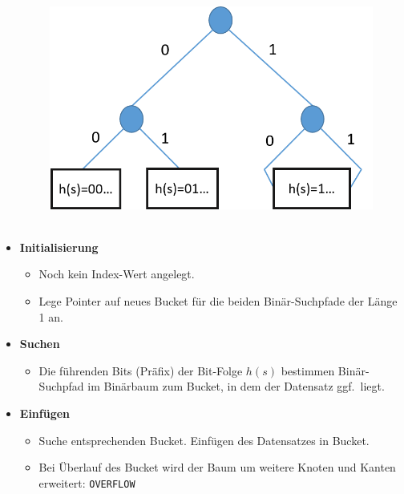 \begin{frame}{\insertsection}
\begin{columns}[T]
\begin{column}{.72\textwidth}
	\end{column}
	\onslide
	\begin{column}{.27\textwidth}
		\begin{figure}
			\includegraphics[scale=0.35]{img/Hash-ext-concept-01.png}
		\end{figure}
	\end{column}
\end{columns}
\end{frame}

\begin{frame}{\insertsection}
\framesubtitle{\insertsubsection}	
\begin{itemize}
	\item \textbf{Initialisierung}
	\begin{itemize}
		\item Noch kein Index-Wert angelegt.
		\item Lege Pointer auf neues Bucket f\"ur die beiden Bin\"ar-Suchpfade der L\"ange 1 an.
	\end{itemize}
	\pause
	\item \textbf{Suchen}
	\begin{itemize}
		\item Die f\"uhrenden Bits (Pr\"afix) der Bit-Folge $h(s)$ bestimmen Bin\"ar-Suchpfad im Bin\"arbaum zum Bucket, 
		in dem der Datensatz ggf.~liegt.
	\end{itemize}
	\pause
	\item \textbf{Einf\"ugen}
	\begin{itemize}
		\item Suche entsprechenden Bucket. Einf\"ugen des Datensatzes in Bucket.
		\pause
		\item Bei \"Uberlauf des Bucket wird der Baum um weitere Knoten und Kanten erweitert: \texttt{OVERFLOW}
	\end{itemize}	
\end{itemize}
\end{frame}

